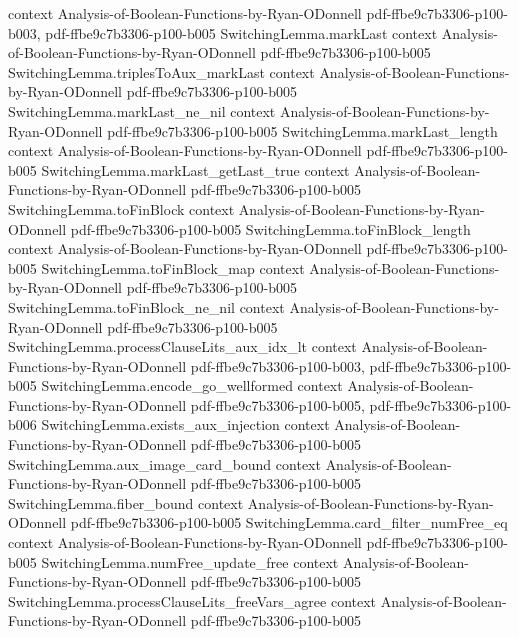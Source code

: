 \begin{theorem}
  {context}
  {Analysis-of-Boolean-Functions-by-Ryan-ODonnell}
  {pdf-ffbe9c7b3306-p100-b003,
    pdf-ffbe9c7b3306-p100-b005}
\proofstep
  {SwitchingLemma.markLast}
  {context}
  {Analysis-of-Boolean-Functions-by-Ryan-ODonnell}
  {pdf-ffbe9c7b3306-p100-b005}
\proofstep
  {SwitchingLemma.triplesToAux_markLast}
  {context}
  {Analysis-of-Boolean-Functions-by-Ryan-ODonnell}
  {pdf-ffbe9c7b3306-p100-b005}
\proofstep
  {SwitchingLemma.markLast_ne_nil}
  {context}
  {Analysis-of-Boolean-Functions-by-Ryan-ODonnell}
  {pdf-ffbe9c7b3306-p100-b005}
\proofstep
  {SwitchingLemma.markLast_length}
  {context}
  {Analysis-of-Boolean-Functions-by-Ryan-ODonnell}
  {pdf-ffbe9c7b3306-p100-b005}
\proofstep
  {SwitchingLemma.markLast_getLast_true}
  {context}
  {Analysis-of-Boolean-Functions-by-Ryan-ODonnell}
  {pdf-ffbe9c7b3306-p100-b005}
\proofstep
  {SwitchingLemma.toFinBlock}
  {context}
  {Analysis-of-Boolean-Functions-by-Ryan-ODonnell}
  {pdf-ffbe9c7b3306-p100-b005}
\proofstep
  {SwitchingLemma.toFinBlock_length}
  {context}
  {Analysis-of-Boolean-Functions-by-Ryan-ODonnell}
  {pdf-ffbe9c7b3306-p100-b005}
\proofstep
  {SwitchingLemma.toFinBlock_map}
  {context}
  {Analysis-of-Boolean-Functions-by-Ryan-ODonnell}
  {pdf-ffbe9c7b3306-p100-b005}
\proofstep
  {SwitchingLemma.toFinBlock_ne_nil}
  {context}
  {Analysis-of-Boolean-Functions-by-Ryan-ODonnell}
  {pdf-ffbe9c7b3306-p100-b005}
\proofstep
  {SwitchingLemma.processClauseLits_aux_idx_lt}
  {context}
  {Analysis-of-Boolean-Functions-by-Ryan-ODonnell}
  {pdf-ffbe9c7b3306-p100-b003,
    pdf-ffbe9c7b3306-p100-b005}
\proofstep
  {SwitchingLemma.encode_go_wellformed}
  {context}
  {Analysis-of-Boolean-Functions-by-Ryan-ODonnell}
  {pdf-ffbe9c7b3306-p100-b005,
    pdf-ffbe9c7b3306-p100-b006}
\proofstep
  {SwitchingLemma.exists_aux_injection}
  {context}
  {Analysis-of-Boolean-Functions-by-Ryan-ODonnell}
  {pdf-ffbe9c7b3306-p100-b005}
\proofstep
  {SwitchingLemma.aux_image_card_bound}
  {context}
  {Analysis-of-Boolean-Functions-by-Ryan-ODonnell}
  {pdf-ffbe9c7b3306-p100-b005}
\proofstep
  {SwitchingLemma.fiber_bound}
  {context}
  {Analysis-of-Boolean-Functions-by-Ryan-ODonnell}
  {pdf-ffbe9c7b3306-p100-b005}
\proofstep
  {SwitchingLemma.card_filter_numFree_eq}
  {context}
  {Analysis-of-Boolean-Functions-by-Ryan-ODonnell}
  {pdf-ffbe9c7b3306-p100-b005}
\proofstep
  {SwitchingLemma.numFree_update_free}
  {context}
  {Analysis-of-Boolean-Functions-by-Ryan-ODonnell}
  {pdf-ffbe9c7b3306-p100-b005}
\proofstep
  {SwitchingLemma.processClauseLits_freeVars_agree}
  {context}
  {Analysis-of-Boolean-Functions-by-Ryan-ODonnell}
  {pdf-ffbe9c7b3306-p100-b005}

\end{theorem}
